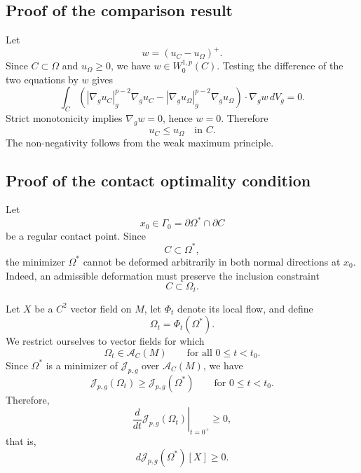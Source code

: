 \documentclass{article}
\begin{document}
\subsection{Proof of the comparison result}

Let
\[
w=(u_C-u_\Omega)^+.
\]
Since $C\subset\Omega$ and $u_\Omega\geq0$, we have
$w\in W_0^{1,p}(C)$. Testing the difference of the two equations by
$w$ gives
\[
\int_C
\left(
|\nabla_g u_C|_g^{p-2}\nabla_g u_C
-
|\nabla_g u_\Omega|_g^{p-2}\nabla_g u_\Omega
\right)
\cdot\nabla_gw\,dV_g=0.
\]
Strict monotonicity implies $\nabla_gw=0$, hence $w=0$. Therefore
\[
u_C\leq u_\Omega\quad\text{in }C.
\]
The non-negativity follows from the weak maximum principle.

\subsection{Proof of the contact optimality condition}

Let
\[
x_0\in\Gamma_0
=
\partial\Omega^\ast\cap\partial C
\]
be a regular contact point. Since
\[
C\subset\Omega^\ast,
\]
the minimizer $\Omega^\ast$ cannot be deformed arbitrarily in both
normal directions at $x_0$. Indeed, an admissible deformation must
preserve the inclusion constraint
\[
C\subset\Omega_t.
\]

Let $X$ be a $C^2$ vector field on $M$, let $\Phi_t$ denote its local
flow, and define
\[
\Omega_t=\Phi_t(\Omega^\ast).
\]
We restrict ourselves to vector fields for which
\[
\Omega_t\in\mathcal A_C(M)
\qquad\text{for all }0\leq t<t_0.
\]
Since $\Omega^\ast$ is a minimizer of $\mathcal J_{p,g}$ over
$\mathcal A_C(M)$, we have
\[
\mathcal J_{p,g}(\Omega_t)
\geq
\mathcal J_{p,g}(\Omega^\ast)
\qquad\text{for }0\leq t<t_0.
\]
Therefore,
\[
\left.
\frac{d}{dt}
\mathcal J_{p,g}(\Omega_t)
\right|_{t=0^+}
\geq0,
\]
that is,
\begin{equation}
d\mathcal J_{p,g}(\Omega^\ast)[X]\geq0.
\label{eq:one-sided-contact-variation}
\end{equation}
\end{document}
